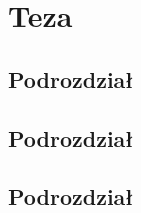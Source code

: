\chapter{Teza} \label{chap:thesis}

\bt

\section{Podrozdział}

\bt

\section{Podrozdział}

\bt 

\section{Podrozdział}

\bt 
